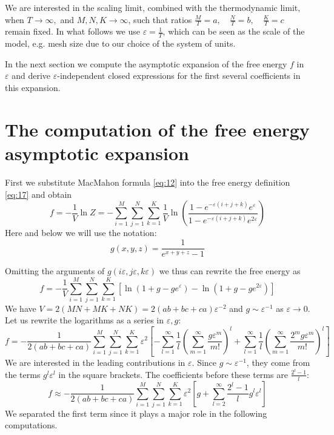 \documentclass{article}
\begin{document}
We are interested in the scaling limit, combined with the thermodynamic limit, when $ T\to \infty,$
and $M,N,K\to \infty$, such that ratios $\frac{M}{T}=a,\quad \frac{N}{T}=b, \quad \frac{K}{T}=c$
remain fixed. In what follows we use $\varepsilon=\frac{1}{T}$, which can be seen as the scale of
the model, e.g. mesh size due to our choice of the system of units.

In the next section we compute the asymptotic expansion of the free energy $f$ in $\varepsilon$ and
derive $\varepsilon$-independent closed expressions for the first several coefficients in this
expansion.
  
\section{The computation of the free energy asymptotic expansion}
\label{sec:free-energy-scaling}
First we substitute MacMahon formula \eqref{eq:12} into the free energy definition \eqref{eq:17} and
obtain
\begin{equation}
  \label{eq:20}
    f=-\frac{1}{V}\ln Z =- \sum_{i=1}^{M} \sum_{j=1}^{N} \sum_{k=1}^{K} \frac{1}{V}
  \ln\left(\frac{1-e^{-\varepsilon (i+j+k)} e^{\varepsilon}}{1-e^{-\varepsilon (i+j+k)} e^{2\varepsilon}}\right)
\end{equation}
Here and below we will use the notation:
\begin{equation}
  \label{eq:5}
  g(x,y,z)=\frac{1}{e^{x+y+z}-1}
\end{equation}

Omitting the arguments of $g(i\varepsilon,j\varepsilon,k\varepsilon)$ we thus can rewrite the free energy as
\begin{equation}
  \label{eq:2}
  f=-\frac{1}{V}\sum_{i=1}^{M} \sum_{j=1}^{N} \sum_{k=1}^{K} \left[\ln\left(1+g-g e^{\varepsilon}\right)-\ln\left(1+g-g e^{2\varepsilon}\right)\right]
\end{equation}
We have $V=2(MN+MK+NK)=2(ab+bc+ca)\varepsilon^{-2}$ and $g\sim \varepsilon^{-1}$ as
$\varepsilon\to 0$. Let us rewrite the logarithms as a series in $\varepsilon, g$:
\begin{equation}
  \label{eq:25}
  f=-\frac{1}{2(ab+bc+ca)}\sum_{i=1}^{M} \sum_{j=1}^{N} \sum_{k=1}^{K} \varepsilon^{2}
  \left[-\sum_{l=1}^{\infty}\frac{1}{l}\left(\sum_{m=1}^{\infty}\frac{g\varepsilon^{m}}{m!}\right)^{l}+
    \sum_{l=1}^{\infty}\frac{1}{l}\left(\sum_{m=1}^{\infty}\frac{2^{m} g\varepsilon^{m}}{m!}\right)^{l}\right]
\end{equation}
We are interested in the leading contributions in $\varepsilon$. Since $g\sim \varepsilon^{-1}$,
they come from the terms $g^{l}\varepsilon^{l}$ in the square brackets. The coefficients before
these terms are $\frac{2^{l}-1}{l}$:
\begin{equation}
  \label{eq:36}
  f\approx-\frac{1}{2(ab+bc+ca)}\sum_{i=1}^{M} \sum_{j=1}^{N} \sum_{k=1}^{K} \varepsilon^{2} \left[g+\sum_{l=2}^{\infty}\frac{2^{l}-1}{l}g^{l}\varepsilon^{l}\right]
\end{equation}
We separated the first term since it plays a major role in the following computations. 
\end{document}

